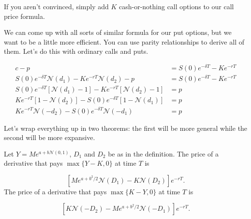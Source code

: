 \documentclass{ximera}
\begin{document}
If you aren't convinced, simply add $K$ cash-or-nothing call options to our call price formula. 

We can come up with all sorts of similar formula for our put options, but we want to be a little more efficient. You can use parity relationships to derive all of them. Let's do this with ordinary calls and puts.

\begin{align*}
c-p 											&=S(0)e^{-\delta T}-Ke^{-rT}\\
S(0)e^{-\delta T}\mathcal{N}(d_1)-Ke^{-rT}\mathcal{N}(d_2)-p 		&=S(0)e^{-\delta T}-Ke^{-rT}\\
S(0)e^{-\delta T}[\mathcal{N}(d_1)-1]-Ke^{-rT}[\mathcal{N}(d_2)-1] 	&=p\\
Ke^{-rT}[1-\mathcal{N}(d_2)]-S(0)e^{-\delta T}[1-\mathcal{N}(d_1)] 	&=p\\
Ke^{-rT}\mathcal{N}(-d_2)-S(0)e^{-\delta T}\mathcal{N}(-d_1) 		&=p
\end{align*}

Let's wrap everything up in two theorems: the first will be more general while the second will be more expansive.

\begin{theorem}
Let $Y=Me^{a+b\mathcal{N}(0,1)}$, $D_1$ and $D_2$ be as in the definition. The price of a derivative that pays $\max\{Y-K,0\}$ at time $T$ is

	\begin{equation*}
	\left[Me^{a+b^2/2}\mathcal{N}(D_1)-K\mathcal{N}(D_2)\right]e^{-rT}.
	\end{equation*}
The price of a derivative that pays $\max\{K-Y,0\}$ at time $T$ is

	\begin{equation*}
	\left[K\mathcal{N}(-D_2)-Me^{a+b^2/2}\mathcal{N}(-D_1)\right]e^{-rT}.
	\end{equation*}
\end{theorem}
\end{document}
